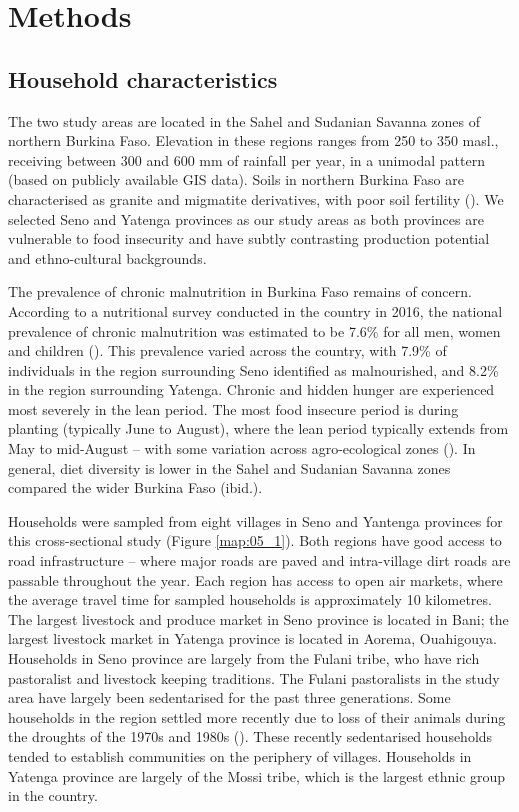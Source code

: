 \section{Methods}

\subsection{Household characteristics}

The two study areas are located in the Sahel and Sudanian Savanna zones of northern Burkina Faso. Elevation in these regions ranges from 250 to 350 masl., receiving between 300 and 600 mm of rainfall per year, in a unimodal pattern (based on publicly available GIS data). Soils in northern Burkina Faso are characterised as granite and migmatite derivatives, with poor soil fertility (\citealp{FAO2002}). We selected Seno and Yatenga provinces as our study areas as both provinces are vulnerable to food insecurity and have subtly contrasting production potential and ethno-cultural backgrounds.

The prevalence of chronic malnutrition in Burkina Faso remains of concern. According to a nutritional survey conducted in the country in 2016, the national prevalence of chronic malnutrition was estimated to be 7.6\% for all men, women and children (\citealp{MinistryofHealthBurkinaFaso2016}). This prevalence varied across the country, with 7.9\% of individuals in the region surrounding Seno identified as malnourished, and 8.2\% in the region surrounding Yatenga. Chronic and hidden hunger are experienced most severely in the lean period. The most food insecure period is during planting (typically June to August), where the lean period typically extends from May to mid-August -- with some variation across agro-ecological zones (\citealp{Some2018}). In general, diet diversity is lower in the Sahel and Sudanian Savanna zones compared the wider Burkina Faso (ibid.).

Households were sampled from eight villages in Seno and Yantenga provinces for this cross-sectional study (Figure \ref{map:05_1}). Both regions have good access to road infrastructure -- where major roads are paved and intra-village dirt roads are passable throughout the year. Each region has access to open air markets, where the average travel time for sampled households is approximately 10 kilometres. The largest livestock and produce market in Seno province is located in Bani; the largest livestock market in Yatenga province is located in Aorema, Ouahigouya. Households in Seno province are largely from the Fulani tribe, who have rich pastoralist and livestock keeping traditions. The Fulani pastoralists in the study area have largely been sedentarised for the past three generations. Some households in the region settled more recently due to loss of their animals during the droughts of the 1970s and 1980s (\citealp{Bovin1990}). These recently sedentarised households tended to establish communities on the periphery of villages. Households in Yatenga province are largely of the Mossi tribe, which is the largest ethnic group in the country.


